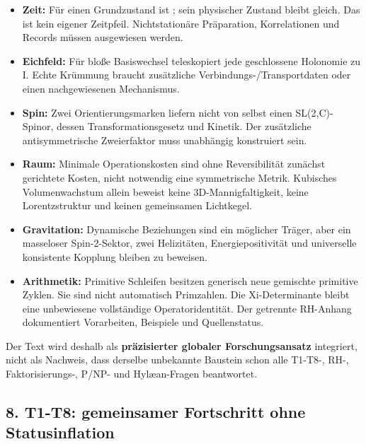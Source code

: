 \begin{itemize}
\tightlist
\item
  \textbf{Zeit:} Für einen Grundzustand ist
  ;
  sein physischer Zustand bleibt gleich. Das ist kein eigener Zeitpfeil.
  Nichtstationäre Präparation, Korrelationen und Records müssen
  ausgewiesen werden.
\item
  \textbf{Eichfeld:} Für bloße Basiswechsel 
  teleskopiert jede geschlossene Holonomie zu I. Echte Krümmung braucht
  zusätzliche Verbindungs-/Transportdaten oder einen nachgewiesenen
  Mechanismus.
\item
  \textbf{Spin:} Zwei Orientierungsmarken liefern nicht von selbst einen
  SL(2,C)-Spinor, dessen Transformationsgesetz und Kinetik. Der
  zusätzliche antisymmetrische Zweierfaktor muss unabhängig konstruiert
  sein.
\item
  \textbf{Raum:} Minimale Operationskosten sind ohne Reversibilität
  zunächst gerichtete Kosten, nicht notwendig eine symmetrische Metrik.
  Kubisches Volumenwachstum allein beweist keine 3D-Mannigfaltigkeit,
  keine Lorentzstruktur und keinen gemeinsamen Lichtkegel.
\item
  \textbf{Gravitation:} Dynamische Beziehungen sind ein möglicher
  Träger, aber ein masseloser Spin-2-Sektor, zwei Helizitäten,
  Energiepositivität und universelle konsistente Kopplung bleiben zu
  beweisen.
\item
  \textbf{Arithmetik:} Primitive Schleifen besitzen generisch neue
  gemischte primitive Zyklen. Sie sind nicht automatisch Primzahlen. Die
  Xi-Determinante bleibt eine unbewiesene vollständige
  Operatoridentität. Der getrennte RH-Anhang dokumentiert Vorarbeiten,
  Beispiele und Quellenstatus.
\end{itemize}

Der Text wird deshalb als \textbf{präzisierter globaler
Forschungsansatz} integriert, nicht als Nachweis, dass derselbe
unbekannte Baustein schon alle T1-T8-, RH-, Faktorisierungs-, P/NP- und
Hylæan-Fragen beantwortet.

\subsection{8. T1-T8: gemeinsamer Fortschritt ohne
Statusinflation}\label{t1-t8-gemeinsamer-fortschritt-ohne-statusinflation}

